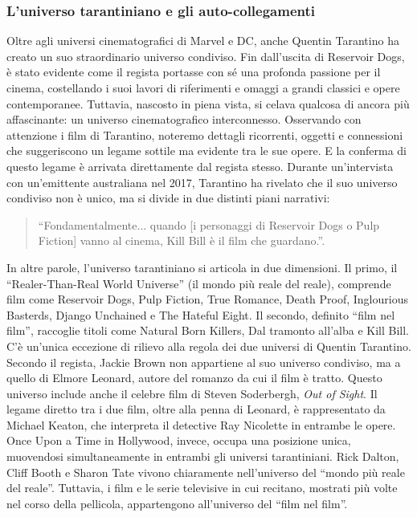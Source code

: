 \documentclass[12pt]{article} %
\begin{document}
\subsubsection*{L'universo tarantiniano e gli auto-collegamenti}
\begin{flushleft}
    Oltre agli universi cinematografici di Marvel e DC, anche Quentin Tarantino ha creato un suo straordinario universo condiviso. Fin dall'uscita di Reservoir Dogs, è stato evidente come il regista portasse con sé una profonda passione per il cinema, costellando i suoi lavori di riferimenti e omaggi a grandi classici e opere contemporanee. Tuttavia, nascosto in piena vista, si celava qualcosa di ancora più affascinante: un universo cinematografico interconnesso. Osservando con attenzione i film di Tarantino, noteremo dettagli ricorrenti, oggetti e connessioni che suggeriscono un legame sottile ma evidente tra le sue opere. E la conferma di questo legame è arrivata direttamente dal regista stesso. Durante un'intervista con un'emittente australiana nel 2017, Tarantino ha rivelato che il suo universo condiviso non è unico, ma si divide in due distinti piani narrativi: 
    \begin{quote}“Fondamentalmente... quando [i personaggi di Reservoir Dogs o Pulp Fiction] vanno al cinema, Kill Bill è il film che guardano.”.
    \end{quote}
In altre parole, l’universo tarantiniano si articola in due dimensioni. Il primo, il “Realer-Than-Real World Universe” (il mondo più reale del reale), comprende film come Reservoir Dogs, Pulp Fiction, True Romance, Death Proof, Inglourious Basterds, Django Unchained e The Hateful Eight. Il secondo, definito “film nel film”, raccoglie titoli come Natural Born Killers, Dal tramonto all’alba e Kill Bill.
C'è un’unica eccezione di rilievo alla regola dei due universi di Quentin Tarantino. Secondo il regista, Jackie Brown non appartiene al suo universo condiviso, ma a quello di Elmore Leonard, autore del romanzo da cui il film è tratto. Questo universo include anche il celebre film di Steven Soderbergh, \textit{Out of Sight}. Il legame diretto tra i due film, oltre alla penna di Leonard, è rappresentato da Michael Keaton, che interpreta il detective Ray Nicolette in entrambe le opere.
Once Upon a Time in Hollywood, invece, occupa una posizione unica, muovendosi simultaneamente in entrambi gli universi tarantiniani. Rick Dalton, Cliff Booth e Sharon Tate vivono chiaramente nell’universo del “mondo più reale del reale”. Tuttavia, i film e le serie televisive in cui recitano, mostrati più volte nel corso della pellicola, appartengono all’universo del “film nel film”.\\\vspace{1cm}

\end{flushleft}
\end{document}
